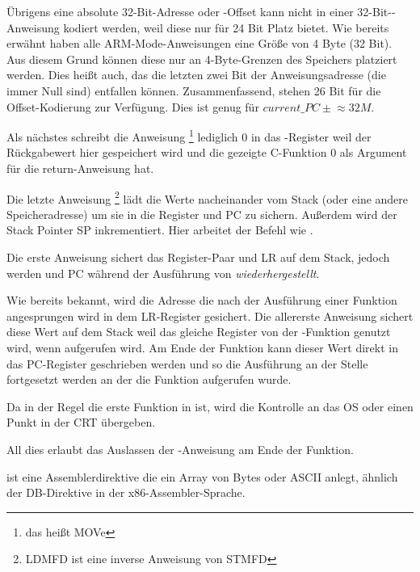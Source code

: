 Übrigens eine absolute 32-Bit-Adresse oder -Offset kann nicht in einer 32-Bit--Anweisung kodiert werden,
weil diese nur für 24 Bit Platz bietet. Wie bereits erwähnt haben alle ARM-Mode-Anweisungen eine Größe
von 4 Byte (32 Bit). Aus diesem Grund können diese nur an 4-Byte-Grenzen des Speichers platziert werden.
Dies heißt auch, das die letzten zwei Bit der Anweisungsadresse (die immer Null sind) entfallen können.
Zusammenfassend, stehen 26 Bit für die Offset-Kodierung zur Verfügung. Dies ist genug für
$current\_PC \pm{} \approx{}32M$.

Als nächstes schreibt die Anweisung \footnote{das heißt MOVe} lediglich 0 in
das -Register weil der Rückgabewert hier gespeichert wird und die gezeigte C-Funktion 0
als Argument für die return-Anweisung hat.

Die letzte Anweisung \footnote{\ac{LDMFD} ist eine inverse Anweisung von \ac{STMFD}}
lädt die Werte nacheinander vom Stack (oder eine andere Speicheradresse) um sie in die Register  und \ac{PC}
zu sichern. Außerdem wird der Stack Pointer \ac{SP} inkrementiert. Hier arbeitet der Befehl wie \POP.

Die erste Anweisung  sichert das Register-Paar  und \ac{LR} auf dem Stack, jedoch werden  und \ac{PC}
während der Ausführung von  \emph{wiederhergestellt}.

Wie bereits bekannt, wird die Adresse die nach der Ausführung einer Funktion angesprungen wird in dem \ac{LR}-Register gesichert.
Die allererste Anweisung sichert diese Wert auf dem Stack weil das gleiche Register von der \main-Funktion genutzt wird,
wenn \printf aufgerufen wird.
Am Ende der Funktion kann dieser Wert direkt in das \ac{PC}-Register geschrieben werden und so die Ausführung an der
Stelle fortgesetzt werden an der die Funktion aufgerufen wurde.

Da \main in der Regel die erste Funktion in \CCpp ist, wird die Kontrolle an das \ac{OS} oder einen Punkt in der
\ac{CRT} übergeben.

All dies erlaubt das Auslassen der -Anweisung am Ende der Funktion.

 ist eine Assemblerdirektive die ein Array von Bytes oder ASCII anlegt, ähnlich der DB-Direktive
in der x86-Assembler-Sprache.
